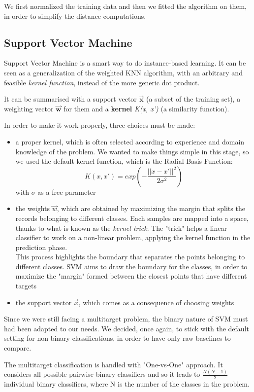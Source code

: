 We first normalized the training data and then we fitted the algorithm on them, in order to simplify the distance computations.

\subsection{Support Vector Machine}
Support Vector Machine is a smart way to do instance-based learning. It can be seen as a generalization of the weighted KNN algorithm, with an arbitrary and feasible \textit{kernel function}, instead of the more generic dot product.

It can be summarised with a support vector $ \mathbf{\vec{x}} $ (a subset of the training set), a weighting vector $ \mathbf{\vec{w}} $ for them and a \textbf{kernel} \textit{K(x, x')} (a similarity function).

In order to make it work properly, three choices must be made:
\begin{itemize}
	\item[\PencilRight] a proper kernel, which is often selected according to experience and domain knowledge of the problem. We wanted to make things simple in this stage, so we used the default kernel function, which is the Radial Basis Function:\label{rbf}
	\[ K(x, x') = exp(- \frac{||x-x'||^{2}}{2\sigma^{2}}) \]
	with $ \sigma $ as a free parameter
	\item[\PencilRight] the weights $ \vec{w} $, which are obtained by maximizing the margin that splits the records belonging to different classes. Each samples are mapped into a space, thanks to what is known as the \textit{kernel trick}. The "trick" helps a linear classifier to work on a non-linear problem, applying the kernel function in the prediction phase.\\This process highlights the boundary that separates the points belonging to different classes.
	SVM aims to draw the boundary for the classes, in order to maximize the "margin" formed between the closest points that have different targets
	\item[\PencilRight] the support vector $ \vec{x} $, which comes as a consequence of choosing weights
\end{itemize}
Since we were still facing a multitarget problem, the binary nature of SVM must had been adapted to our needs. We decided, once again, to stick with the default setting for non-binary classifications, in order to have only raw baselines to compare.

The multitarget classification is handled with "One-vs-One" approach.
It considers all possible pairwise binary classifiers and so it leads to $\frac{N(N-1)}{2}$ individual binary classifiers, where N is the number of the classes in the problem.

